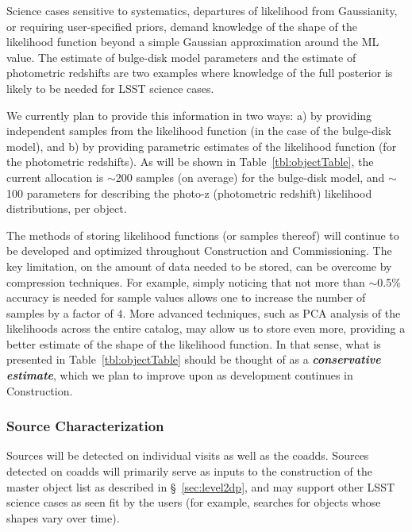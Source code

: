 \documentclass[SE,lsstdraft,toc]{lsstdoc}
\begin{document}
Science cases sensitive to systematics, departures of likelihood from Gaussianity, or requiring user-specified priors, demand knowledge of the shape of the likelihood function beyond a simple Gaussian approximation around the ML value. The estimate of bulge-disk model parameters and the estimate of photometric redshifts are two examples where knowledge of the full posterior is likely to be needed for LSST science cases.

We currently plan to provide this information in two ways: a) by providing independent samples from the likelihood function (in the case of the bulge-disk model), and b) by providing parametric estimates of the likelihood function (for the photometric redshifts). As will be shown in Table~\ref{tbl:objectTable}, the current allocation is $\sim$200 samples (on average) for the bulge-disk model, and $\sim$100 parameters for describing the photo-z (photometric redshift) likelihood distributions, per object.

The methods of storing likelihood functions (or samples thereof) will continue to be developed and optimized throughout Construction and Commissioning. The key limitation, on the amount of data needed to be stored, can be overcome by compression techniques. For example, simply noticing that not more than $\sim$0.5\% accuracy is needed for sample values allows one to increase the number of samples by a factor of $4$. More advanced techniques, such as PCA analysis of the likelihoods across the entire catalog, may allow us to store even more, providing a better estimate of the shape of the likelihood function. In that sense, what is presented in Table~\ref{tbl:objectTable} should be thought of as a \textbf{\emph{conservative estimate}}, which we plan to improve upon as development continues in Construction.

\subsubsection{Source Characterization}
\label{sec:sourceMeas}

Sources will be detected on individual visits as well as the coadds. Sources detected on coadds will primarily serve as inputs to the construction of the master object list as described in \S~\ref{sec:level2dp}, and may support other LSST science cases as seen fit by the users (for example, searches for objects whose shapes vary over time). 
\end{document}
